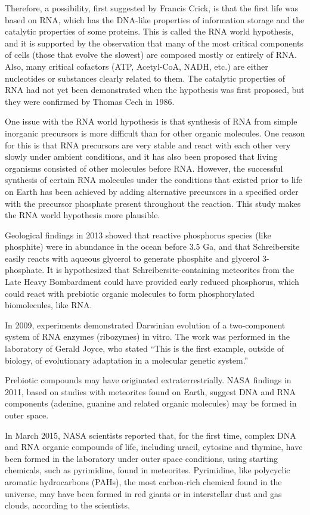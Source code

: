 Therefore, a possibility, first suggested by Francis Crick, is that the first life was based on RNA, which has the DNA-like properties of information storage and the catalytic properties of some proteins. This is called the RNA world hypothesis, and it is supported by the observation that many of the most critical components of cells (those that evolve the slowest) are composed mostly or entirely of RNA. Also, many critical cofactors (ATP, Acetyl-CoA, NADH, etc.) are either nucleotides or substances clearly related to them. The catalytic properties of RNA had not yet been demonstrated when the hypothesis was first proposed, but they were confirmed by Thomas Cech in 1986.

One issue with the RNA world hypothesis is that synthesis of RNA from simple inorganic precursors is more difficult than for other organic molecules. One reason for this is that RNA precursors are very stable and react with each other very slowly under ambient conditions, and it has also been proposed that living organisms consisted of other molecules before RNA. However, the successful synthesis of certain RNA molecules under the conditions that existed prior to life on Earth has been achieved by adding alternative precursors in a specified order with the precursor phosphate present throughout the reaction. This study makes the RNA world hypothesis more plausible.

Geological findings in 2013 showed that reactive phosphorus species (like phosphite) were in abundance in the ocean before 3.5 Ga, and that Schreibersite easily reacts with aqueous glycerol to generate phosphite and glycerol 3-phosphate. It is hypothesized that Schreibersite-containing meteorites from the Late Heavy Bombardment could have provided early reduced phosphorus, which could react with prebiotic organic molecules to form phosphorylated biomolecules, like RNA.

In 2009, experiments demonstrated Darwinian evolution of a two-component system of RNA enzymes (ribozymes) in vitro. The work was performed in the laboratory of Gerald Joyce, who stated ``This is the first example, outside of biology, of evolutionary adaptation in a molecular genetic system.''

Prebiotic compounds may have originated extraterrestrially. NASA findings in 2011, based on studies with meteorites found on Earth, suggest DNA and RNA components (adenine, guanine and related organic molecules) may be formed in outer space.

In March 2015, NASA scientists reported that, for the first time, complex DNA and RNA organic compounds of life, including uracil, cytosine and thymine, have been formed in the laboratory under outer space conditions, using starting chemicals, such as pyrimidine, found in meteorites. Pyrimidine, like polycyclic aromatic hydrocarbons (PAHs), the most carbon-rich chemical found in the universe, may have been formed in red giants or in interstellar dust and gas clouds, according to the scientists.

